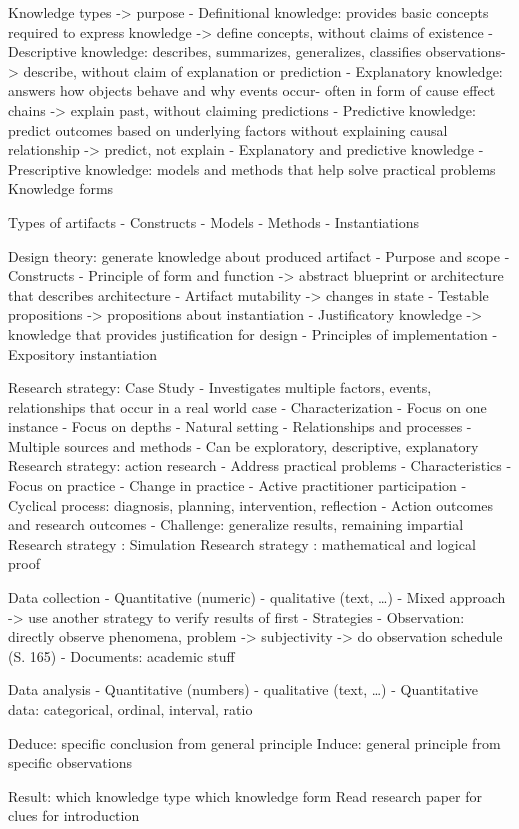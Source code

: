 Knowledge types -> purpose
- Definitional knowledge: provides basic concepts required to express knowledge -> define concepts,
    without claims of existence
- Descriptive knowledge: describes, summarizes, generalizes, classifies observations-> describe,
    without claim of explanation or prediction
- Explanatory knowledge: answers how objects behave and why events occur- often in form of cause
    effect chains -> explain past, without claiming predictions
- Predictive knowledge: predict outcomes based on underlying factors without explaining causal
    relationship -> predict, not explain
- Explanatory and predictive knowledge
- Prescriptive knowledge: models and methods that help solve practical problems
Knowledge forms

Types of artifacts
- Constructs
- Models
- Methods
- Instantiations

Design theory: generate knowledge about produced artifact
- Purpose and scope
- Constructs
- Principle of form and function -> abstract blueprint or architecture that describes architecture
- Artifact mutability -> changes in state
- Testable propositions -> propositions about instantiation
- Justificatory knowledge -> knowledge that provides justification for design
- Principles of implementation
- Expository instantiation

Research strategy: Case Study
- Investigates multiple factors, events, relationships that occur in a real world case
- Characterization
    - Focus on one instance
    - Focus on depths
    - Natural setting
    - Relationships and processes
    - Multiple sources and methods
- Can be exploratory, descriptive, explanatory
Research strategy: action research
- Address practical problems
- Characteristics
    - Focus on practice
    - Change in practice
    - Active practitioner participation
    - Cyclical process: diagnosis, planning, intervention, reflection
    - Action outcomes and research outcomes
- Challenge: generalize results, remaining impartial
Research strategy	: Simulation
Research strategy	: mathematical and logical proof

Data collection
- Quantitative (numeric) - qualitative (text, …)
- Mixed approach -> use another strategy to verify results of first
- Strategies
    - Observation: directly observe phenomena, problem -> subjectivity -> do observation schedule (S. 165)
    - Documents: academic stuff

Data analysis
- Quantitative (numbers) - qualitative (text, …)
- Quantitative data: categorical, ordinal, interval, ratio

Deduce: specific conclusion from general principle
Induce: general principle from specific observations


Result: which knowledge type which knowledge form
Read research paper for clues for introduction
